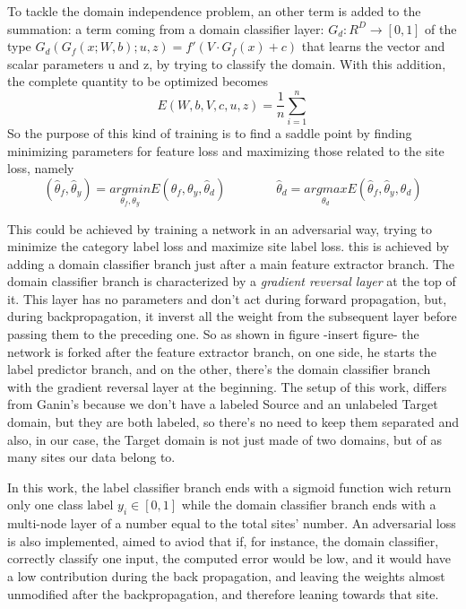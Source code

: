 \documentclass[a4paper,11pt]{article}
\begin{document}
To tackle the domain independence problem, an other term is added to the summation: a term coming from a domain classifier layer: $G_d:R^D \rightarrow [0, 1]$ of the type $G_d(G_f(x; W, b); u, z) = f'(V\cdot G_f(x) + c)$ that learns the vector and scalar parameters u and z, by trying to classify the domain.
With this addition, the complete quantity to be optimized becomes
\begin{equation}
E(W, b, V, c, u, z) = \frac{1}{n} \sum_{i = 1}^n
\end{equation}
So the purpose of this kind of training is to find a saddle point by finding minimizing parameters for feature loss and maximizing those related to the site loss, namely
\begin{equation}
(\hat \theta_f, \hat \theta_y) = \underset{\theta_f, \theta_y}{argmin} E(\theta_f, \theta_y, \hat \theta_d) \qquad \qquad \hat \theta_d = \underset{\theta_d}{argmax} E(\hat \theta_f, \hat \theta_y, \theta_d)
\end{equation}

This could be achieved by training a network in an adversarial way, trying to minimize the category label loss and maximize site label loss.
this is achieved by adding a domain classifier branch just after a main feature extractor branch.
The domain classifier branch is characterized by a \emph{gradient reversal layer} at the top of it.
This layer has no parameters and don't act during forward propagation, but, during backpropagation, it inverst all the weight from the subsequent layer before passing them to the preceding one.
So as shown in figure -insert figure- the network is forked after the feature extractor branch, on one side, he starts the label predictor branch, and on the other, there's the domain classifier branch with the gradient reversal layer at the beginning.
The setup of this work, differs from Ganin's because we don't have a labeled Source and an unlabeled Target domain, but they are both labeled, so there's no need to keep them separated and also, in our case, the Target domain is not just made of two domains, but of as many sites our data belong to.

In this work, the label classifier branch ends with a sigmoid function wich return only one class label $y_i \in [0, 1]$ while the domain classifier branch ends with a multi-node layer of a number equal to the total sites' number.
An adversarial loss is also implemented, aimed to aviod that if, for instance, the domain classifier, correctly classify one input, the computed error would be low, and it would have a low contribution during the back propagation, and leaving the weights almost unmodified after the backpropagation, and therefore leaning towards that site.
\end{document}
